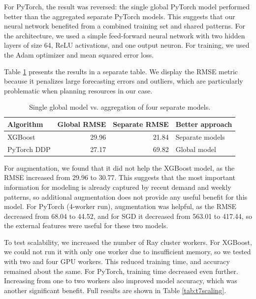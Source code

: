 \documentclass[fleqn,moreauthors,9pt]{ds_report}
\begin{document}
For PyTorch, the result was reversed: the single global PyTorch model performed better than the aggregated separate PyTorch models. This suggests that our neural network benefited from a combined training set and shared patterns. For the architecture, we used a simple feed-forward neural network with two hidden layers of size 64, ReLU activations, and one output neuron. For training, we used the Adam optimizer and mean squared error loss.

Table \ref{tab:t7singleagg} presents the results in a separate table. We display the RMSE metric because it penalizes large forecasting errors and outliers, which are particularly problematic when planning resources in our case.

\begin{table}[h]
\centering
\caption{Single global model vs. aggregation of four separate models.}
\label{tab:t7singleagg}
\scriptsize
\begin{tabular*}{\columnwidth}{@{\extracolsep{\fill}}lrrl}
\toprule
Algorithm & Global RMSE & Separate RMSE & Better approach \\
\midrule
XGBoost & 29.96 & 21.84 & Separate models \\
PyTorch DDP & 27.17 & 69.82 & Global model \\
\bottomrule
\end{tabular*}
\end{table}

For augmentation, we found that it did not help the XGBoost model, as the RMSE increased from 29.96 to 30.77. This suggests that the most important information for modeling is already captured by recent demand and weekly patterns, so additional augmentation does not provide any useful benefit for this model. For PyTorch (4-worker run), augmentation was helpful, as the RMSE decreased from 68.04 to 44.52, and for SGD it decreased from 563.01 to 417.44, so the external features were useful for these two models.

To test scalability, we increased the number of Ray cluster workers. For XGBoost, we could not run it with only one worker due to insufficient memory, so we tested with two and four GPU workers. This reduced training time, and accuracy remained about the same. For PyTorch, training time decreased even further. Increasing from one to two workers also improved model accuracy, which was another significant benefit. Full results are shown in Table \ref{tab:t7scaling}.
\end{document}

